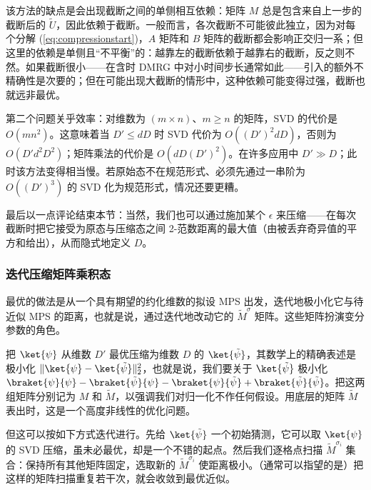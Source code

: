 该方法的缺点是会出现截断之间的单侧相互依赖：矩阵 $M$ 总是包含来自上一步的截断后的 $\tilde{U}$，因此依赖于截断。一般而言，各次截断不可能彼此独立，因为对每个分解 (\ref{eq:compressionstart})，$A$ 矩阵和 $B$ 矩阵的截断都会影响正交归一系；但这里的依赖是单侧且``不平衡''的：越靠左的截断依赖于越靠右的截断，反之则不然。如果截断很小——在含时 DMRG 中对小时间步长通常如此——引入的额外不精确性是次要的；但在可能出现大截断的情形中，这种依赖可能变得过强，截断也就远非最优。

第二个问题关乎效率：对维数为 $(m\times n)$、$m\ge n$ 的矩阵，SVD 的代价是 $O(m n^2)$。这意味着当 $D' \le dD$ 时 SVD 代价为 $O((D')^2 dD)$，否则为 $O(D' d^2 D^2)$；矩阵乘法的代价是 $O(dD(D')^2)$。在许多应用中 $D'\gg D$；此时该方法变得相当慢。若原始态不在规范形式、必须先通过一串阶为 $O((D')^3)$ 的 SVD 化为规范形式，情况还要更糟。

最后以一点评论结束本节：当然，我们也可以通过施加某个 $\epsilon$ 来压缩——在每次截断时把它接受为原态与压缩态之间 2-范数距离的最大值（由被丢弃奇异值的平方和给出），从而隐式地定义 $D$。

\subsubsection{迭代压缩矩阵乘积态}
最优的做法是从一个具有期望的约化维数的拟设 MPS 出发，迭代地极小化它与待近似 MPS 的距离，也就是说，通过迭代地改动它的 $\tilde{M}^\sigma$ 矩阵。这些矩阵扮演变分参数的角色。

把 $\ket{\psi}$ 从维数 $D'$ 最优压缩为维数 $D$ 的 $\ket{\tilde{\psi}}$，其数学上的精确表述是极小化 $\| \ket{\psi} - \ket{\tilde{\psi}} \|_2^2$，也就是说，我们要关于 $\ket{\tilde{\psi}}$ 极小化 $\braket{\psi}{\psi} - \braket{\tilde{\psi}}{\psi} -\braket{\psi}{\tilde{\psi}} + \braket{\tilde{\psi}}{\tilde{\psi}}$。把这两组矩阵分别记为 $M$ 和 $\tilde{M}$，以强调我们对归一化不作任何假设。用底层的矩阵 $\tilde{M}$ 表出时，这是一个高度非线性的优化问题。

但这可以按如下方式迭代进行。先给 $\ket{\tilde{\psi}}$ 一个初始猜测，它可以取 $\ket{\psi}$ 的 SVD 压缩，虽未必最优，却是一个不错的起点。然后我们逐格点扫描 $\tilde{M}^{\sigma_i}$ 集合：保持所有其他矩阵固定，选取新的 $\tilde{M}^{\sigma_i}$ 使距离极小。（通常可以指望的是）把这样的矩阵扫描重复若干次，就会收敛到最优近似。

